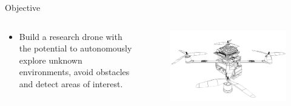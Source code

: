 \begin{frame}{Objective}


    \begin{columns}
        \begin{column}{0.4\textwidth}
        \begin{itemize}
            \item Build a research drone with the potential to autonomously explore unknown environments, avoid obstacles and detect areas of interest.
        \end{itemize}
        \end{column}
        \begin{column}{0.6\textwidth}  %
            \begin{figure}
                \centering
                \includegraphics[width=1\textwidth]{img/carcara2.png}
                \label{fig:carcara3}
            \end{figure}
        \end{column}
    \end{columns}
\end{frame}




